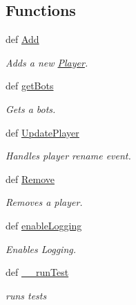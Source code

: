 \subsection*{Functions}
\begin{DoxyCompactItemize}
\item 
def \hyperlink{namespace_player_a7afb4f3ed0dc5209e4e8d4a28fb2e5cb}{Add}
\begin{DoxyCompactList}\small\item\em Adds a new \hyperlink{namespace_player}{Player}. \item\end{DoxyCompactList}\item 
def \hyperlink{namespace_player_aa5fb66d32493d33b1b64665e26b54aa5}{getBots}
\begin{DoxyCompactList}\small\item\em Gets a bots. \item\end{DoxyCompactList}\item 
def \hyperlink{namespace_player_a61462686e6399e37ccd208d65b523de2}{UpdatePlayer}
\begin{DoxyCompactList}\small\item\em Handles player rename event. \item\end{DoxyCompactList}\item 
def \hyperlink{namespace_player_a844c8f2121893f0c340b23ceedc4a6d2}{Remove}
\begin{DoxyCompactList}\small\item\em Removes a player. \item\end{DoxyCompactList}\item 
def \hyperlink{namespace_player_a83914537581346383eaeded9e3cc688d}{enableLogging}
\begin{DoxyCompactList}\small\item\em Enables Logging. \item\end{DoxyCompactList}\item 
\hypertarget{namespace_player_a96afd3d64eb4fc36aac14a3fc6abaa59}{
def \hyperlink{namespace_player_a96afd3d64eb4fc36aac14a3fc6abaa59}{\_\-\_\-runTest}}
\label{namespace_player_a96afd3d64eb4fc36aac14a3fc6abaa59}

\begin{DoxyCompactList}\small\item\em runs tests \item\end{DoxyCompactList}\end{DoxyCompactItemize}
